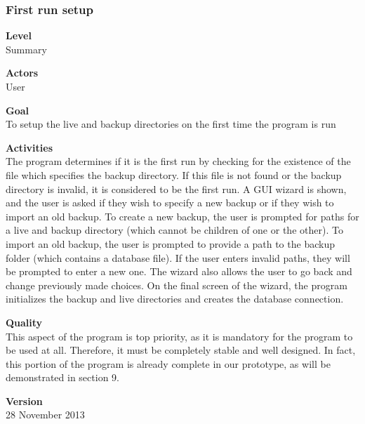 \documentclass[12pt,a4paper]{article}
\begin{document}
\subsubsection{First run setup}
\begin{description}
	\item \textbf{Level}  \\
	Summary
	\item \textbf{Actors} \\
	User
	\item \textbf{Goal} \\
	To setup the live and backup directories on the first time the program is run 
	\item \textbf{Activities} \\
	The program determines if it is the first run by checking for the existence of the file which specifies the backup directory. If this 	file is not found or the backup directory is invalid, it is considered to be the first run. A GUI wizard is shown, and the user is 			asked if they wish to specify a new backup or if they wish to import an old backup. To create a new backup, the user is 				prompted for paths for a live and backup directory (which cannot be children of one or the other). To import an old backup, the 	user is prompted to provide a path to the backup folder (which contains a database file). If the user enters invalid paths, they 		will be prompted to enter a new one. The wizard also allows the user to go back and change previously made choices. On the 			final screen of the wizard, the program initializes the backup and live directories and creates the database connection. 
	\item \textbf{Quality} \\
	This aspect of the program is top priority, as it is mandatory for the program to be used at all. Therefore, it must be completely 	stable and well designed. In fact, this portion of the program is already complete in our prototype, as will be demonstrated in 			section 9. 
	\item \textbf{Version} \\
	28 November 2013	
\end{description}
\end{document}
